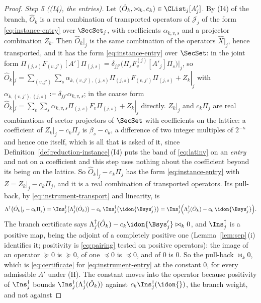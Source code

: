 \begin{proof}
\emph{Step 5 ((I4), the entries).} Let $(\hat O_k,\bowtie_k,c_k)\in\CList_j[A'_j]$.
By (I4) of the branch, $\hat O_k$ is a real combination of transported
operators of $\mathcal{J}_j$ of the form \eqref{eq:instance-entry} over
$\SecSet_j$, with coefficients $\alpha_{k,v,s}$ and a projector combination
$Z_k$. Then $\hat O_k|_j$ is the same combination of the operators
$\hat X|_j$, hence transported, and it has the form \eqref{eq:instance-entry}
over $\SecSet$: in the joint form
$\Pi_{(j,s)}F_{(v,j')}[A']\Pi_{(j,s)}=\delta_{jj'}\big(\Pi_sF^{(j)}_v[A'_j]\Pi_s\big)\big|_j$,
so $\hat O_k|_j=\sum_{(v,j')}\sum_{s}\alpha_{k,(v,j'),(j,s)}
\Pi_{(j,s)}F_{(v,j')}\Pi_{(j,s)}+Z_k|_j$ with
$\alpha_{k,(v,j'),(j,s)}\coloneqq\delta_{jj'}\alpha_{k,v,s}$; in the coarse
form $\hat O_k|_j=\sum_v\sum_s\alpha_{k,v,s}\Pi_{(j,s)}F_v\Pi_{(j,s)}+Z_k|_j$
directly. $Z_k|_j$ and $c_k\Pi_j$ are real combinations of sector
projectors of $\SecSet$ with coefficients on the lattice: a coefficient of
$Z_k|_j-c_k\Pi_j$ is $\beta_s-c_k$, a difference of two integer multiples of
$2^{-\kappa}$ and hence one itself, which is all that is asked of it, since
Definition~\ref{def:reduction-instance}\,(I4) puts the band of
\eqref{eq:latinv} on an \emph{entry} and not on a coefficient and this step
uses nothing about the coefficient beyond its being on the lattice. So
$\hat O_k|_j-c_k\Pi_j$ has the form \eqref{eq:instance-entry} with
$Z=Z_k|_j-c_k\Pi_j$, and it is a real combination of transported operators.
Its pull-back, by \eqref{eq:instrument-transport} and linearity, is
\begin{equation*}
  \Lambda^{\dagger}\big(\hat O_k|_j-c_k\Pi_j\big)
  =\Ins_j^{\dagger}\big(\Lambda_j^{\dagger}(\hat O_k)\big)
   -c_k\,\Ins_j^{\dagger}\big(\idon{\Bsys'_j}\big)
  =\Ins_j^{\dagger}\Big(\Lambda_j^{\dagger}(\hat O_k)-c_k\,\idon{\Bsys'_j}\Big).
\end{equation*}
The branch certificate says
$\Lambda_j^{\dagger}(\hat O_k)-c_k\idon{\Bsys'_j}\bowtie_k0$, and
$\Ins_j^{\dagger}$ is a positive map, being the adjoint of a completely
positive one (Lemma~\ref{lem:sep}\,(i) identifies it; positivity is
\eqref{eq:pairing} tested on positive operators): the image of an operator
$\succeq0$ is $\succeq0$, of one $\preceq0$ is $\preceq0$, and of $0$ is $0$.
So the pull-back $\bowtie_k0$, which is \eqref{eq:certificate} for
\eqref{eq:instrument-entry} at the constant $0$, for every admissible $A'$
under (H). The constant moves into the operator because positivity of
$\Ins_j^{\dagger}$ bounds $\Ins_j^{\dagger}(\Lambda_j^{\dagger}(\hat O_k))$
against $c_k\Ins_j^{\dagger}(\idon{})$, the branch weight, and not against

\end{proof}
